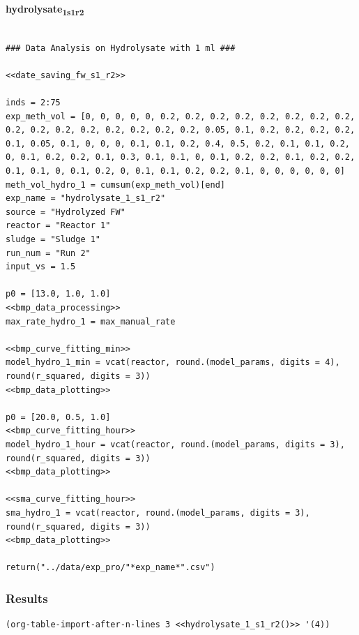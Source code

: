 \documentclass[11pt]{article}
\begin{document}
\textbf{hydrolysate\textsubscript{1}\textsubscript{s1}\textsubscript{r2}}
\begin{verbatim}

### Data Analysis on Hydrolysate with 1 ml ###

<<date_saving_fw_s1_r2>>

inds = 2:75
exp_meth_vol = [0, 0, 0, 0, 0, 0.2, 0.2, 0.2, 0.2, 0.2, 0.2, 0.2, 0.2, 0.2, 0.2, 0.2, 0.2, 0.2, 0.2, 0.2, 0.2, 0.05, 0.1, 0.2, 0.2, 0.2, 0.2, 0.1, 0.05, 0.1, 0, 0, 0, 0.1, 0.1, 0.2, 0.4, 0.5, 0.2, 0.1, 0.1, 0.2, 0, 0.1, 0.2, 0.2, 0.1, 0.3, 0.1, 0.1, 0, 0.1, 0.2, 0.2, 0.1, 0.2, 0.2, 0.1, 0.1, 0, 0.1, 0.2, 0, 0.1, 0.1, 0.2, 0.2, 0.1, 0, 0, 0, 0, 0, 0]
meth_vol_hydro_1 = cumsum(exp_meth_vol)[end]
exp_name = "hydrolysate_1_s1_r2"
source = "Hydrolyzed FW"
reactor = "Reactor 1"
sludge = "Sludge 1"
run_num = "Run 2"
input_vs = 1.5

p0 = [13.0, 1.0, 1.0]
<<bmp_data_processing>>
max_rate_hydro_1 = max_manual_rate

<<bmp_curve_fitting_min>>
model_hydro_1_min = vcat(reactor, round.(model_params, digits = 4), round(r_squared, digits = 3))
<<bmp_data_plotting>>

p0 = [20.0, 0.5, 1.0]
<<bmp_curve_fitting_hour>>
model_hydro_1_hour = vcat(reactor, round.(model_params, digits = 3), round(r_squared, digits = 3))
<<bmp_data_plotting>>

<<sma_curve_fitting_hour>>
sma_hydro_1 = vcat(reactor, round.(model_params, digits = 3), round(r_squared, digits = 3))
<<bmp_data_plotting>>

return("../data/exp_pro/"*exp_name*".csv")
\end{verbatim}

\subsubsection{Results}
\label{sec:orgef6049b}

\begin{verbatim}
(org-table-import-after-n-lines 3 <<hydrolysate_1_s1_r2()>> '(4))
\end{verbatim}
\end{document}
